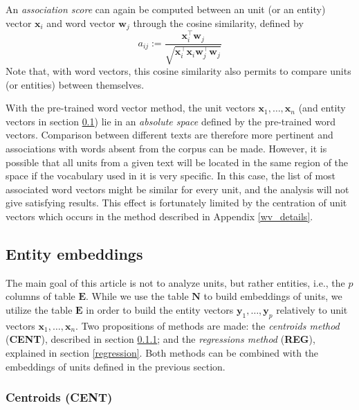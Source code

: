 \documentclass[
twocolumn,
]{ceurart}
\begin{document}
An \emph{association score} can again be computed between an unit (or an entity) vector $\mathbf{x}_i$ and word vector $\mathbf{w}_j$ through the cosine similarity, defined by 
\begin{equation}
a_{ij} := \frac{\mathbf{x}_i^\top \mathbf{w}_j}{\sqrt{\mathbf{x}_i^\top \mathbf{x}_i \mathbf{w}_j^\top \mathbf{w}_j}}
\end{equation}
Note that, with word vectors, this cosine similarity also permits to compare units (or entities) between themselves.

With the pre-trained word vector method, the unit vectors $\mathbf{x}_1, \ldots, \mathbf{x}_n$ (and entity vectors in section \ref{entity_embeddings}) lie in an \emph{absolute space} defined by the pre-trained word vectors. Comparison between different texts are therefore more pertinent and associations with words absent from the corpus can be made. However, it is possible that all units from a given text will be located in the same region of the space if the vocabulary used in it is very specific. In this case, the list of most associated word vectors might be similar for every unit, and the analysis will not give satisfying results. This effect is fortunately limited by the centration of unit vectors which occurs in the method described in Appendix \ref{wv_details}.

\subsection{Entity embeddings}
\label{entity_embeddings}

The main goal of this article is not to analyze units, but rather entities, i.e., the $p$ columns of table $\mathbf{E}$. While we use the table $\mathbf{N}$ to build embeddings of units, we utilize the table $\mathbf{E}$ in order to build the entity vectors $\mathbf{y}_1, \ldots, \mathbf{y}_p$ relatively to unit vectors $\mathbf{x}_1, \ldots, \mathbf{x}_n$. Two propositions of methods are made: the \emph{centroids method} (\textbf{CENT}), described in section \ref{centroid}; and the \emph{regressions method} (\textbf{REG}), explained in section \ref{regression}. Both methods can be combined with the embeddings of units defined in the previous section.

\subsubsection{Centroids (CENT)}
\label{centroid}
\end{document}
